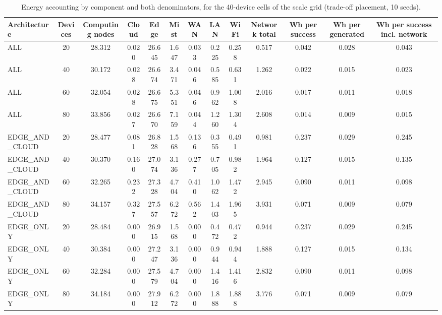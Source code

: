 \begin{table}
\centering
\scriptsize
\caption{Energy accounting by component and both denominators, for the 40-device cells of the scale grid (trade-off placement, 10 seeds).}
\label{tab:p1-energy}
\begin{tabular}{lcccccccccccc}
\toprule
Architecture & Devices & Computing nodes & Cloud & Edge & Mist & WAN & LAN & WiFi & Network total & Wh per success & Wh per generated & Wh per success incl. network \\
\midrule
ALL & 20 & 28.312 & 0.020 & 26.645 & 1.647 & 0.033 & 0.225 & 0.258 & 0.517 & 0.042 & 0.028 & 0.043 \\
ALL & 40 & 30.172 & 0.028 & 26.674 & 3.471 & 0.046 & 0.585 & 0.631 & 1.262 & 0.022 & 0.015 & 0.023 \\
ALL & 60 & 32.054 & 0.028 & 26.675 & 5.351 & 0.046 & 0.962 & 1.008 & 2.016 & 0.017 & 0.011 & 0.018 \\
ALL & 80 & 33.856 & 0.027 & 26.670 & 7.159 & 0.044 & 1.260 & 1.304 & 2.608 & 0.014 & 0.009 & 0.015 \\
EDGE\_AND\_CLOUD & 20 & 28.477 & 0.081 & 26.828 & 1.568 & 0.136 & 0.355 & 0.491 & 0.981 & 0.237 & 0.029 & 0.245 \\
EDGE\_AND\_CLOUD & 40 & 30.370 & 0.160 & 27.074 & 3.136 & 0.277 & 0.705 & 0.982 & 1.964 & 0.127 & 0.015 & 0.135 \\
EDGE\_AND\_CLOUD & 60 & 32.265 & 0.232 & 27.328 & 4.704 & 0.410 & 1.062 & 1.472 & 2.945 & 0.090 & 0.011 & 0.098 \\
EDGE\_AND\_CLOUD & 80 & 34.157 & 0.327 & 27.557 & 6.272 & 0.562 & 1.403 & 1.965 & 3.931 & 0.071 & 0.009 & 0.079 \\
EDGE\_ONLY & 20 & 28.484 & 0.000 & 26.915 & 1.568 & 0.000 & 0.472 & 0.472 & 0.944 & 0.237 & 0.029 & 0.245 \\
EDGE\_ONLY & 40 & 30.384 & 0.000 & 27.247 & 3.136 & 0.000 & 0.944 & 0.944 & 1.888 & 0.127 & 0.015 & 0.134 \\
EDGE\_ONLY & 60 & 32.284 & 0.000 & 27.579 & 4.704 & 0.000 & 1.416 & 1.416 & 2.832 & 0.090 & 0.011 & 0.098 \\
EDGE\_ONLY & 80 & 34.184 & 0.000 & 27.912 & 6.272 & 0.000 & 1.888 & 1.888 & 3.776 & 0.071 & 0.009 & 0.079 \\
\bottomrule
\end{tabular}
\par\vspace{2pt}{\footnotesize\raggedright Wh per success and Wh per generated share one numerator: computing-node energy. Network energy is reported separately by the simulator and is not mixed into either denominator.\par}
\end{table}

